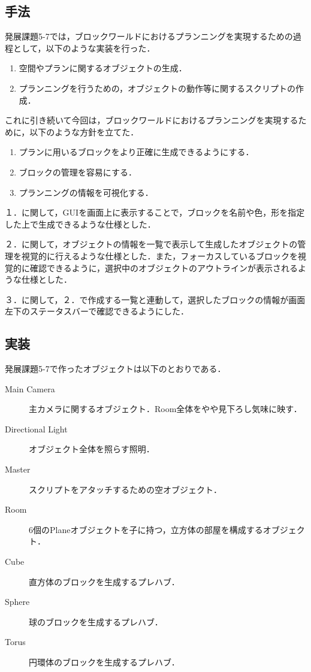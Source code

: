 \documentclass[12pt]{jarticle}
\begin{document}
\subsection{手法}
発展課題5-7では，ブロックワールドにおけるプランニングを実現するための過程として，以下のような実装を行った．
\begin{enumerate}
\item 空間やプランに関するオブジェクトの生成．
\item プランニングを行うための，オブジェクトの動作等に関するスクリプトの作成．
\end{enumerate}

これに引き続いて今回は，ブロックワールドにおけるプランニングを実現するために，以下のような方針を立てた．
\begin{enumerate}
\item プランに用いるブロックをより正確に生成できるようにする．
\item ブロックの管理を容易にする．
\item プランニングの情報を可視化する．
\end{enumerate}

１．に関して，GUIを画面上に表示することで，ブロックを名前や色，形を指定した上で生成できるような仕様とした．

２．に関して，オブジェクトの情報を一覧で表示して生成したオブジェクトの管理を視覚的に行えるような仕様とした．また，フォーカスしているブロックを視覚的に確認できるように，選択中のオブジェクトのアウトラインが表示されるような仕様とした．

３．に関して，２．で作成する一覧と連動して，選択したブロックの情報が画面左下のステータスバーで確認できるようにした．

\subsection{実装}
発展課題5-7で作ったオブジェクトは以下のとおりである．
\begin{description}
\item[Main Camera] 主カメラに関するオブジェクト．Room全体をやや見下ろし気味に映す．
\item[Directional Light] オブジェクト全体を照らす照明．
\item[Master] スクリプトをアタッチするための空オブジェクト．
\item[Room] 6個のPlaneオブジェクトを子に持つ，立方体の部屋を構成するオブジェクト．
\item[Cube] 直方体のブロックを生成するプレハブ．
\item[Sphere] 球のブロックを生成するプレハブ．
\item[Torus] 円環体のブロックを生成するプレハブ．
\end{description} 
\end{document}
